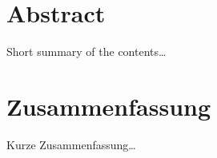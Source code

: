 

\begingroup
\let\clearpage\relax
\let\cleardoublepage\relax
\let\cleardoublepage\relax

\chapter{Abstract} %

Short summary of the contents\dots

\endgroup

\vfill
\pagebreak



\begingroup
\let\clearpage\relax
\let\cleardoublepage\relax
\let\cleardoublepage\relax

\chapter{Zusammenfassung} %

Kurze Zusammenfassung\dots

\endgroup

\vfill

